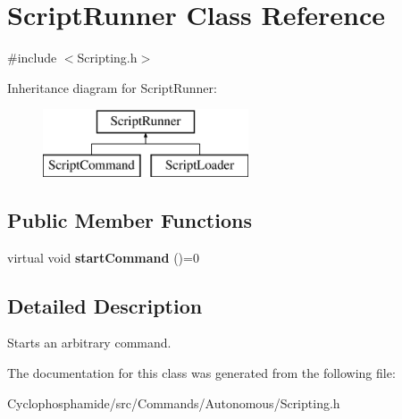 \hypertarget{class_script_runner}{}\section{Script\+Runner Class Reference}
\label{class_script_runner}


{\ttfamily \#include $<$Scripting.\+h$>$}

Inheritance diagram for Script\+Runner\+:\begin{figure}[H]
\begin{center}
\leavevmode
\includegraphics[height=2.000000cm]{class_script_runner}
\end{center}
\end{figure}
\subsection*{Public Member Functions}
\begin{DoxyCompactItemize}
\item 
\hypertarget{class_script_runner_ab4a70a8d8caa68659c42925272e19975}{}virtual void {\bfseries start\+Command} ()=0\label{class_script_runner_ab4a70a8d8caa68659c42925272e19975}

\end{DoxyCompactItemize}


\subsection{Detailed Description}
Starts an arbitrary command. 

The documentation for this class was generated from the following file\+:\begin{DoxyCompactItemize}
\item 
Cyclophosphamide/src/\+Commands/\+Autonomous/Scripting.\+h\end{DoxyCompactItemize}
